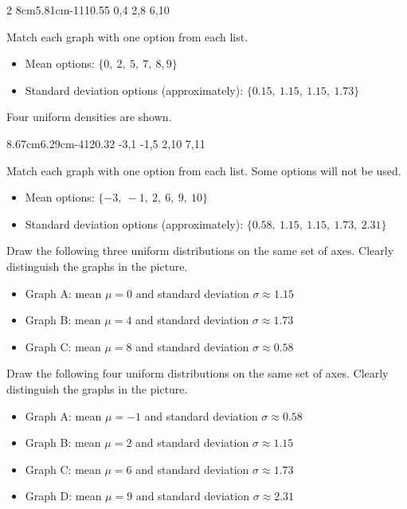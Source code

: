 \begin{multicols}{2}
		\vspace{-0.7cm}
		\UniformThreeGraph
		{8cm}{5.81cm}{-1}{11}{0.55}
		{0,4}
		{2,8}
		{6,10}
		
		Match each graph with one option from each list.
		\begin{itemize}
			\item Mean options: $\{0,\ 2,\ 5,\ 7,\ 8, 9\}$
			\item Standard deviation options (approximately): $\{0.15,\ 1.15,\ 1.15,\ 1.73\}$
		\end{itemize}
		
		\vspace{-0.35cm}
		Four uniform densities are shown.
		
		\vspace{-0.7cm}
		\UniformFourGraph
		{8.67cm}{6.29cm}{-4}{12}{0.32}
		{-3,1}
		{-1,5}
		{2,10}
		{7,11}
		
		Match each graph with one option from each list. Some options will not be used.
		\begin{itemize}
			\item Mean options: $\{-3,\ -1,\ 2,\ 6,\ 9, \ 10 \}$
			\item Standard deviation options (approximately): $\{0.58,\ 1.15,\ 1.15,\ 1.73,\ 2.31\}$
		\end{itemize}
		
		\vspace{-0.35cm}
		Draw the following three uniform distributions on the same set of axes. Clearly distinguish the graphs in the picture.
		\begin{itemize}
			\item Graph A: mean $\mu=0$ and standard deviation $\sigma\approx1.15$
			\item Graph B: mean $\mu=4$ and standard deviation $\sigma\approx1.73$
			\item Graph C: mean $\mu=8$ and standard deviation $\sigma\approx0.58$
		\end{itemize}
		
		\vspace{-0.35cm}
		Draw the following four uniform distributions on the same set of axes. Clearly distinguish the graphs in the picture.
		\begin{itemize}
			\item Graph A: mean $\mu=-1$ and standard deviation $\sigma\approx0.58$
			\item Graph B: mean $\mu=2$ and standard deviation $\sigma\approx1.15$
			\item Graph C: mean $\mu=6$ and standard deviation $\sigma\approx1.73$
			\item Graph D: mean $\mu=9$ and standard deviation $\sigma\approx2.31$
		\end{itemize}
		

\end{multicols}
